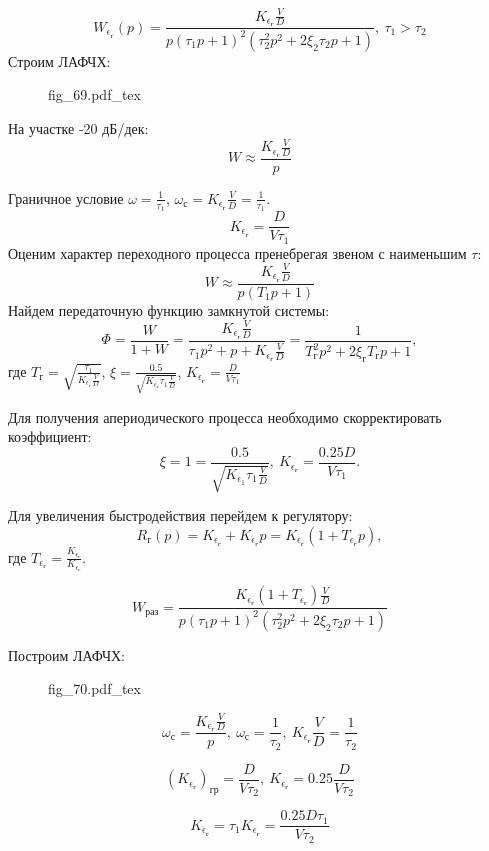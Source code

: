 \documentclass{article}
\newcommand{\incfig}[1]{
    {#1.pdf_tex}
}
\begin{document}
\[
	W_{\epsilon_\text{г}}(p)= \frac{K_{\epsilon_\text{г}}
		\frac{V}{D}}{p(\tau_{1}p + 1)^2 ( \tau_2^2 p^2 + 2 \xi_2 \tau_2 p + 1 )}, \
	\tau_1 > \tau_2
\]
Строим ЛАФЧХ:
\begin{figure}[H]
	\centering
	\incfig{fig_69}
	\label{fig:fig_69}
\end{figure}
На участке -20 дБ/дек:
\[
	W \approx \frac{K_{\epsilon_\text{г}} \frac{V}{D}}{p}
\]

Граничное условие $\omega = \frac{1}{\tau_1}$, $\omega_\text{с} =
	K_{\epsilon_\text{г}} \frac{V}{D} = \frac{1}{\tau_1}$.
\[
	K_{\epsilon_\text{г}} = \frac{D}{V \tau_1}
\]
Оценим характер переходного процесса пренебрегая звеном с наименьшим $\tau$:
\[
	W \approx \frac{K_{\epsilon_\text{г}} \frac{V}{D}}{p (T_1 p + 1)}
\]
Найдем передаточную функцию замкнутой системы:
\[
	\Phi = \frac{W}{1 + W} = \frac{K_{\epsilon_\text{г}} \frac{V}{D}}{\tau_1
		p^2 + p + K_{\epsilon_\text{г}} \frac{V}{D}}= \frac{1}{ T_\text{г}^2 p^2 +
		2 \xi_\text{г} T_\text{г} p + 1 },
\]
где $T_\text{г} = \sqrt{ \frac{\tau_1}{K_{\epsilon_\text{г}} \frac{V}{D}}}$,
$\xi = \frac{0.5}{\sqrt{K_{\epsilon_\text{г}} \tau_1 \frac{V}{D}}}$,
$K_{\epsilon_\text{г}} = \frac{D}{V \tau_1}$

Для получения апериодического процесса необходимо скорректировать коэффициент:
\[
	\xi = 1 = \frac{0.5}{\sqrt{K_{\epsilon_1} \tau_1 \frac{V}{D}}}, \
	K_{\epsilon_\text{г}} = \frac{ 0.25 D}{V \tau_1}.
\]


Для увеличения быстродействия перейдем к регулятору:
\[
	R_\text{г} (p) = K_{\epsilon_\text{г}} + K_{\dot{\epsilon}_\text{г}}p =
	K_{\epsilon_\text{г}}(1 + T_{\epsilon_\text{г}} p),
\]
где $T_{\epsilon_{\text{г}}} =
	\frac{K_{\dot{\epsilon}_{\text{г}}}}{K_{\epsilon_\text{г}}}$.

\[
	W_\text{раз} = \frac{K_{\epsilon_\text{г}}(1 +  T_{\epsilon_\text{г}} )
		\frac{V}{D}}{p(\tau_{1}p + 1)^2 ( \tau_2^2 p^2 + 2 \xi_2 \tau_2 p + 1 )}
\]

Построим ЛАФЧХ:
\begin{figure}[H]
	\centering
	\incfig{fig_70}
	\label{fig:fig_70}
\end{figure}

\[
	\omega_\text{с}   = \frac{K_{\epsilon_\text{г}} \frac{V}{D}}{p}, \
	\omega_\text{с} = \frac{1}{\tau_2}, \ K_{\epsilon_\text{г}} \frac{V}{D} =
	\frac{1}{\tau_2}
\]

\[
	(K_{\epsilon_\text{г}})_\text{гр} = \frac{D}{V \tau_2}, \
	K_{\epsilon_\text{г}} = 0.25 \frac{D}{V \tau_2}
\]

\[
	K_{\dot{\epsilon}_{\text{г}}} = \tau_1 K_{\epsilon_\text{г}} = \frac{0.25 D
		\tau_1}{V \tau_2}
\]
\end{document}
